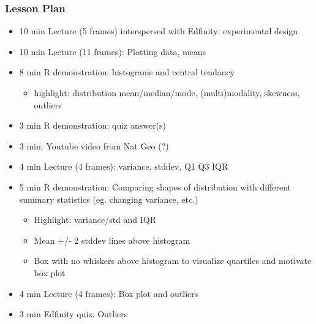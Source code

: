 \begin{frame}
    \frametitle{Lesson Plan}
    \begin{itemize}
        \item 10 min Lecture (5 frames) interspersed with Edfinity: experimental design
        \item 10 min Lecture (11 frames): Plotting data, means
        \item 8 min R demonstration: histograms and central tendancy
        \begin{itemize}
            \item  highlight: distribution mean/median/mode, (multi)modality, skewness, outliers
        \end{itemize}
        \item 3 min R demonstration: quiz answer(s)
        \item 3 min: Youtube video from Nat Geo (?)
        \item 4 min Lecture (4 frames): variance, stddev, Q1 Q3 IQR
        \item 5 min R demonstration: Comparing shapes of distribution with different summary statistics (eg. changing variance, etc.)
        \begin{itemize}
            \item Highlight: variance/std and IQR
            \item Mean +/- 2 stddev lines above histogram
            \item Box with no whiskers above histogram to visualize quartiles and motivate box plot
         \end{itemize}
        \item 4 min Lecture (4 frames): Box plot and outliers
        \item 3 min Edfinity quiz: Outliers
    \end{itemize}
\end{frame}

